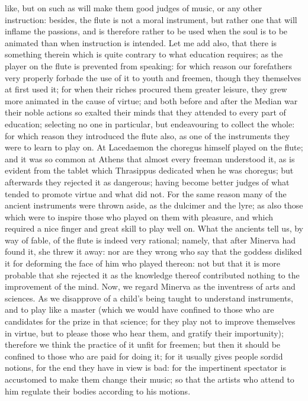 \documentclass[12pt]{article}
\begin{document}
like, but on such as will make them good judges of music, or any other instruction: besides, the flute is not a moral instrument, but rather one that will inflame the passions, and is therefore rather to be used when the soul is to be animated than when instruction is intended. Let me add also, that there is something therein which is quite contrary to what education requires; as the player on the flute is prevented from speaking: for which reason our forefathers very properly forbade the use of it to youth and freemen, though they themselves at first used it; for when their riches procured them greater leisure, they grew more animated in the cause of virtue; and both before and after the Median war their noble actions so exalted their minds that they attended to every part of education; selecting no one in particular, but endeavouring to collect the whole: for which reason they introduced the flute also, as one of the instruments they were to learn to play on. At Lacedaemon the choregus himself played on the flute; and it was so common at Athens that almost every freeman understood it, as is evident from the tablet which Thrasippus dedicated when he was choregus; but afterwards they rejected it as dangerous; having become better judges of what tended to promote virtue and what did not. For the same reason many of the ancient instruments were thrown aside, as the dulcimer and the lyre; as also those which were to inspire those who played on them with pleasure, and which required a nice finger and great skill to play well on. What the ancients tell us, by way of fable, of the flute is indeed very rational; namely, that after Minerva had found it, she threw it away: nor are they wrong who say that the goddess disliked it for deforming the face of him who played thereon: not but that it is more probable that she rejected it as the knowledge thereof contributed nothing to the improvement of the mind. Now, we regard Minerva as the inventress of arts and sciences. As we disapprove of a child's being taught to understand instruments, and to play like a master (which we would have confined to those who are candidates for the prize in that science; for they play not to improve themselves in virtue, but to please those who hear them, and gratify their importunity); therefore we think the practice of it unfit for freemen; but then it should be confined to those who are paid for doing it; for it usually gives people sordid notions, for the end they have in view is bad: for the impertinent spectator is accustomed to make them change their music; so that the artists who attend to him regulate their bodies according to his motions.
\end{document}
